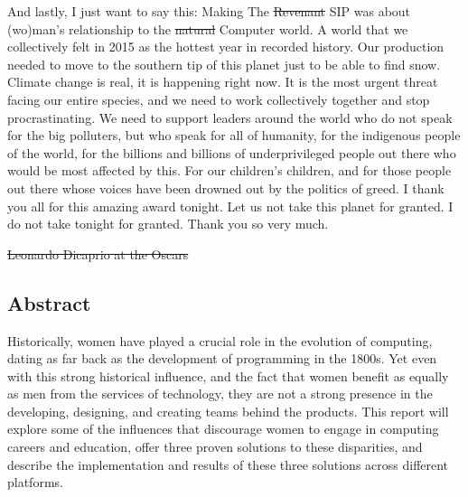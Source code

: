 \documentclass[12pt]{article}
\begin{document}
	And lastly, I just want to say this: Making The \st{Revenant} SIP was about (wo)man's relationship to the \st{natural} Computer world. A world that we collectively felt in 2015 as the hottest year in recorded history. Our production needed to move to the southern tip of this planet just to be able to find snow. Climate change is real, it is happening right now. It is the most urgent threat facing our entire species, and we need to work collectively together and stop procrastinating. We need to support leaders around the world who do not speak for the big polluters, but who speak for all of humanity, for the indigenous people of the world, for the billions and billions of underprivileged people out there who would be most affected by this. For our children’s children, and for those people out there whose voices have been drowned out by the politics of greed. I thank you all for this amazing award tonight. Let us not take this planet for granted. I do not take tonight for granted. Thank you so very much.
	
   \st{Leonardo Dicaprio at the Oscars} 
	
	\pagebreak
	\subsection{Abstract}
	
	Historically, women have played a crucial role in the evolution of computing, dating as far back as the development of programming in the 1800s. Yet even with this strong historical influence, and the fact that women benefit as equally as men from the services of technology, they are not a strong presence in the developing, designing, and creating teams behind the products. This report will explore some of the influences that discourage women to engage in computing careers and education, offer three proven solutions to these disparities, and describe the implementation and results of these three solutions across different platforms. 
	\pagebreak
	
	\tableofcontents
	
	\pagebreak
	
	
	\pagebreak
	
	\listoffigures
	
	\pagebreak
	
	\listofappendices
	
	\pagebreak
	

	\fancyhf{} %
	\fancyhead[C]{\thepage}
	
\end{document}
